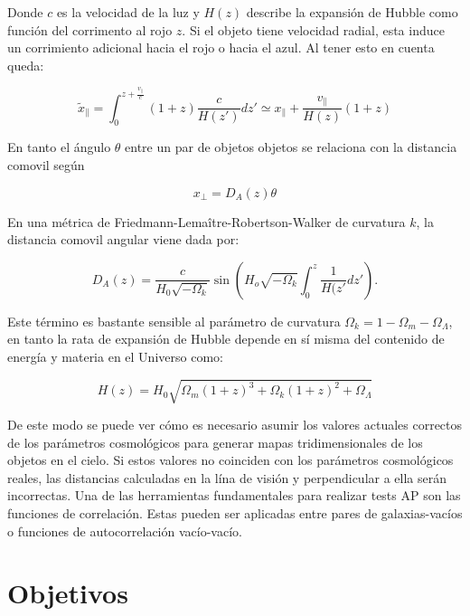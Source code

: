 \documentclass[preprint]{aastex62}
\begin{document}
  Donde $c$ es la velocidad de la luz y $H(z)$ describe la expansión de Hubble como función del
  corrimento al rojo $z$. Si el objeto tiene velocidad radial, esta induce un corrimiento adicional
  hacia el rojo o hacia el azul. Al tener esto en cuenta queda:

  \begin{equation}
    \tilde{x}_{\parallel} = \int _0 ^{z + \frac{v_\parallel}{c}}(1+z) \frac{c}{H(z')}dz'
    \simeq x_\parallel + \frac{v_\parallel}{H(z)}(1+z)
  \end{equation}

  En tanto el ángulo $\theta$  entre un par de objetos objetos se relaciona con la distancia comovil según

  \begin{equation}
    x_{\perp} = D_A(z)\theta
  \end{equation}
  
  En una métrica de  Friedmann-Lema\^itre-Robertson-Walker de curvatura $k$, la distancia
  comovil angular viene dada por:
  
  \begin{equation}
    D_A(z) = \frac{c}{H_0\sqrt{-\Omega_k}} \sin \left( H_o\sqrt{-\Omega_k}
    \int_0^z \frac{1}{H(z'} dz' \right).
  \end{equation}
  
  Este término es bastante sensible al parámetro de curvatura
  $\Omega_k = 1 - \Omega_m - \Omega_\Lambda$, en tanto la rata de expansión de Hubble
  depende en sí misma del contenido de energía y materia en el Universo como:

  \begin{equation}
    H(z) = H_0 \sqrt{ \Omega_m(1+z)^3 + \Omega_k(1+z)^2+\Omega_\Lambda}
  \end{equation}

  De este modo se puede ver cómo es necesario asumir los valores actuales correctos de los
  parámetros cosmológicos para generar mapas tridimensionales de los objetos en el cielo. Si
  estos valores no coinciden con los parámetros
  cosmológicos reales, las distancias calculadas  en la lína de visión y perpendicular a ella serán
  incorrectas. Una de las herramientas fundamentales para realizar tests AP son las funciones
  de correlación. Estas pueden ser aplicadas entre pares de galaxias-vacíos o funciones de
  autocorrelación vacío-vacío.
  

  
  \section{Objetivos}
\end{document}

